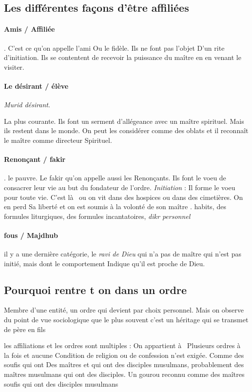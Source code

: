 \subsection{Les différentes façons d'être affiliées}
\paragraph{Amis / Affiliée }. C'est ce qu'on appelle l'ami 
Ou le fidèle. Ils ne font pas l'objet 
D'un rite d'initiation. 
Ils se contentent de recevoir la puissance du maître en en venant le visiter.

\paragraph{Le désirant / élève} \textit{Murid désirant}.

La plus courante. Ils font un serment d'allégeance avec un maître spirituel. 
Mais ils restent dans le monde. On peut les considérer comme 
des oblats et il reconnaît le maître comme directeur 
Spirituel.

\paragraph{Renonçant / fakir} .  le pauvre. Le fakir qu'on appelle aussi les 
Renonçants. Ils font 
le voeu de consacrer 
leur vie au but du fondateur de l'ordre. \textit{Initiation} :
Il forme le voeu pour toute vie. C'est là  ou on vit dans des hospices ou dans des cimetières.
On en perd 
Sa liberté et on est soumis 
à  la volonté de son maître   . habits, des formules 
liturgiques, des formules incantatoires, \textit{dikr personnel} 

\paragraph{fous / Majdhub} il y a une 
    dernière catégorie, le \textit{ravi de Dieu} 
qui  n'a pas de maître 
qui  n'est pas initié, mais dont le 
comportement 
Indique qu'il est proche 
de Dieu. 
 

\subsection{Pourquoi rentre t on dans un ordre}
Membre d'une entité, un ordre qui  devient par choix personnel.   Mais on observe du point de vue sociologique que le plus souvent c'est 
un héritage qui  se 
transmet de père en fils 
\begin{Ex}
  les affiliations et les ordres sont multiples : On appartient à  
Plusieurs ordres à  la fois et aucune Condition de religion ou de confession n'est exigée. Comme des soufis qui  ont 
Des maîtres et qui  ont des disciples musulmans, probablement des maîtres musulmans qui  ont des disciples. Un gourou reconnu comme des maîtres soufis qui  ont des disciples musulmans   
\end{Ex} 

